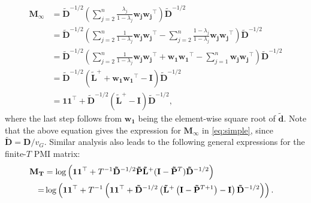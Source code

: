\documentclass[sigconf]{acmart}
\newcommand{\mbf}[1]{\mathbf{#1}}
\newcommand{\bv}[1]{\mathbf{#1}}
\begin{document}
%
\begin{align*}
    \bv{M_\infty}
    &= \mbf{\tilde{D}}^{-1/2} \left( \sum_{j=2}^n \frac{\lambda_j}{1 - \lambda_j} \mbf{w_j} \mbf{w_j}^\top \right) \mbf{\tilde{D}}^{-1/2} \\
    &= \mbf{\tilde{D}}^{-1/2} \left( \sum_{j=2}^n \frac{1}{1 - \lambda_j} \mbf{w_j} \mbf{w_j}^\top - \sum_{j=2}^n \frac{1 - \lambda_j}{1 - \lambda_j} \mbf{w_j} \mbf{w_j}^\top \right) \mbf{\tilde{D}}^{-1/2} \\
    &= \mbf{\tilde{D}}^{-1/2} \left( \sum_{j=2}^n \frac{1}{1 - \lambda_j} \mbf{w_j} \mbf{w_j}^\top + \mbf{w_1} \mbf{w_1}^\top - \sum_{j=1}^n \mbf{w_j} \mbf{w_j}^\top \right) \mbf{\tilde{D}}^{-1/2} \\
    &= \mbf{\tilde{D}}^{-1/2} \left( \mbf{\tilde{L}}^+ + \mbf{w_1} \mbf{w_1}^\top - \mbf{I} \right) \mbf{\tilde{D}}^{-1/2} \\
    &= \mbf{1}\mbf{1}^\top + \mbf{\tilde{D}}^{-1/2} \left( \mbf{\tilde{L}}^+ - \mbf{I} \right) \mbf{\tilde{D}}^{-1/2} ,
\end{align*}
%
where the last step follows from $\mbf{w_1}$ being the element-wise square root of $\bm{\tilde{d}}$. Note that the above equation gives the expression for $\bv{M_\infty}$ in \eqref{eq:simple}, since $\bv{\tilde D} = \bv{D}/v_G$.
Similar analysis also leads to the following general expressions for the finite-$T$ PMI matrix:
%
\begin{align}\label{eq:finite}
    \hspace{-1em} \mbf{M_T}
    &= \log\left( \mbf{1}\mbf{1}^\top + T^{-1} \mbf{\tilde{D}}^{-1/2} \mbf{\tilde{P}} \mbf{\tilde{L}}^+ ( \mbf{I} - \mbf{\tilde{P}}^T ) \mbf{\tilde{D}}^{-1/2} \right) \nonumber \\
    = &\log\left( \mbf{1}\mbf{1}^\top + T^{-1} \left( \mbf{1}\mbf{1}^\top + \mbf{\tilde{D}}^{-1/2} \left( \mbf{\tilde{L}}^+ \left( \mbf{I} - \mbf{\tilde{P}}^{T+1} \right) - \mbf{I} \right) \mbf{\tilde{D}}^{-1/2} \right) \right)  .
\end{align}
%
\end{document}
